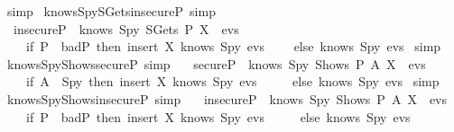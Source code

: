 \begin{isabellebody}
  \isadelimproof
  \endisadelimproof
  \isatagproof
  \isamarkupfalse%
  \ simp%
  \endisatagproof
  {\isafoldproof}%
  \isadelimproof
  \isanewline
  \endisadelimproof
  \isanewline
  \isamarkupfalse%
  \ knows{\isacharunderscore}Spy{\isacharunderscore}SGets{\isacharunderscore}insecureP\ {\isacharbrackleft}simp{\isacharbrackright}\ {\isacharcolon}\isanewline
  \ \ {\isachardoublequoteopen}insecureP\ {\isasymLongrightarrow}\ knows\ Spy\ {\isacharparenleft}SGets\ P\ X\ {\isacharhash}\ evs{\isacharparenright}\ {\isacharequal}\ \isanewline
  \ \ \ \ {\isacharparenleft}if\ {\isacharparenleft}P\ {\isasymin}\ badP{\isacharparenright}\ then\ insert\ X\ {\isacharparenleft}knows\ Spy\ evs{\isacharparenright}\isanewline
  \ \ \ \ else\ knows\ Spy\ evs{\isacharparenright}{\isachardoublequoteclose}\isanewline
  \isadelimproof
  \endisadelimproof
  \isatagproof
  \isamarkupfalse%
  \ simp%
  \endisatagproof
  {\isafoldproof}%
  \isadelimproof
  \isanewline
  \endisadelimproof
  \isanewline
  \isamarkupfalse%
  \ knows{\isacharunderscore}Spy{\isacharunderscore}Shows{\isacharunderscore}secureP\ {\isacharbrackleft}simp{\isacharbrackright}\ {\isacharcolon}\isanewline
  \ \ {\isachardoublequoteopen}secureP\ {\isasymLongrightarrow}\ knows\ Spy\ {\isacharparenleft}Shows\ P\ A\ X\ {\isacharhash}\ evs{\isacharparenright}\ {\isacharequal}\isanewline
  \ \ \ \ {\isacharparenleft}if\ A\ {\isacharequal}\ Spy\ then\ insert\ X\ {\isacharparenleft}knows\ Spy\ evs{\isacharparenright}\isanewline
  \ \ \ \ \ else\ knows\ Spy\ evs{\isacharparenright}{\isachardoublequoteclose}\isanewline
  \isadelimproof
  \endisadelimproof
  \isatagproof
  \isamarkupfalse%
  \ simp%
  \endisatagproof
  {\isafoldproof}%
  \isadelimproof
  \isanewline
  \endisadelimproof
  \isanewline
  \isamarkupfalse%
  \ knows{\isacharunderscore}Spy{\isacharunderscore}Shows{\isacharunderscore}insecureP\ {\isacharbrackleft}simp{\isacharbrackright}\ {\isacharcolon}\isanewline
  \ \ {\isachardoublequoteopen}insecureP\ {\isasymLongrightarrow}\ knows\ Spy\ {\isacharparenleft}Shows\ P\ A\ X\ {\isacharhash}\ evs{\isacharparenright}\ {\isacharequal}\isanewline
  \ \ \ \ {\isacharparenleft}if\ P\ {\isasymin}\ badP\ then\ insert\ X\ {\isacharparenleft}knows\ Spy\ evs{\isacharparenright}\isanewline
  \ \ \ \ \ else\ knows\ Spy\ evs{\isacharparenright}{\isachardoublequoteclose}\isanewline
  \isadelimproof
  \endisadelimproof
  \isatagproof
  \isamarkupfalse%

\end{isabellebody}
